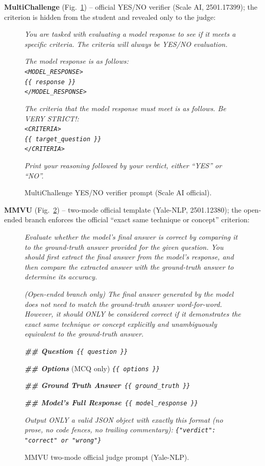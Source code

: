 \textbf{MultiChallenge} (Fig.~\ref{fig:prompt-judge-multich}) -- official YES/NO verifier (Scale AI, 2501.17399); the criterion is hidden from the student and revealed only to the judge:
\begin{figure}[!htbp]
\begin{prompttemplatefig}
\small
\emph{You are tasked with evaluating a model response to see if it meets a specific criteria. The criteria will always be YES/NO evaluation.}

\emph{The model response is as follows:\\
\texttt{<MODEL\_RESPONSE>}\\
\texttt{\{\{ response \}\}}\\
\texttt{</MODEL\_RESPONSE>}}

\emph{The criteria that the model response must meet is as follows. Be VERY STRICT!:\\
\texttt{<CRITERIA>}\\
\texttt{\{\{ target\_question \}\}}\\
\texttt{</CRITERIA>}}

\emph{Print your reasoning followed by your verdict, either ``YES'' or ``NO''.}
\end{prompttemplatefig}
\caption{MultiChallenge YES/NO verifier prompt (Scale AI official).}
\label{fig:prompt-judge-multich}
\end{figure}

\textbf{MMVU} (Fig.~\ref{fig:prompt-judge-mmvu}) -- two-mode official template (Yale-NLP, 2501.12380); the open-ended branch enforces the official ``exact same technique or concept'' criterion:
\begin{figure}[!htbp]
\begin{prompttemplatefig}
\small
\emph{Evaluate whether the model's final answer is correct by comparing it to the ground-truth answer provided for the given question. You should first extract the final answer from the model's response, and then compare the extracted answer with the ground-truth answer to determine its accuracy.}

\emph{(Open-ended branch only) The final answer generated by the model does not need to match the ground-truth answer word-for-word. However, it should ONLY be considered correct if it demonstrates the exact same technique or concept explicitly and unambiguously equivalent to the ground-truth answer.}

\textbf{\emph{\#\# Question}}\ \emph{\texttt{\{\{ question \}\}}}

\textbf{\emph{\#\# Options}} (MCQ only) \emph{\texttt{\{\{ options \}\}}}

\textbf{\emph{\#\# Ground Truth Answer}}\ \emph{\texttt{\{\{ ground\_truth \}\}}}

\textbf{\emph{\#\# Model's Full Response}}\ \emph{\texttt{\{\{ model\_response \}\}}}

\emph{Output ONLY a valid JSON object with exactly this format (no prose, no code fences, no trailing commentary): \texttt{\{"verdict": "correct" or "wrong"\}}}
\end{prompttemplatefig}
\caption{MMVU two-mode official judge prompt (Yale-NLP).}
\label{fig:prompt-judge-mmvu}
\end{figure}

